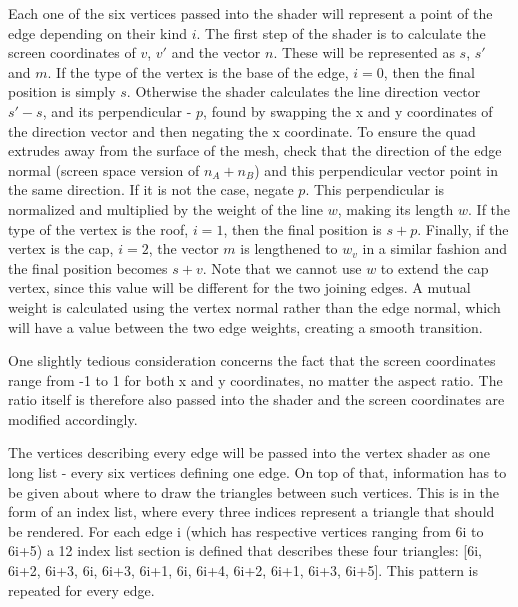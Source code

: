 \documentclass[a4paper, 12pt]{article}
\begin{document}
Each one of the six vertices passed into the shader will represent a point of the edge depending on their kind $i$. The first step of the shader is to calculate the screen coordinates of  $v$, $v'$ and the vector $n$. These will be represented as $s$, $s'$ and $m$. If the type of the vertex is the base of the edge, $i=0$, then the final position is simply $s$. Otherwise the shader calculates the line direction vector $s'-s$, and its perpendicular - $p$, found by swapping the x and y coordinates of the direction vector and then negating the x coordinate. To ensure the quad extrudes away from the surface of the mesh, check that the direction of the edge normal (screen space version of $n_A+n_B$) and this perpendicular vector point in the same direction. If it is not the case, negate $p$. This perpendicular is normalized and multiplied by the weight of the line $w$, making its length $w$. If the type of the vertex is the roof, $i=1$, then the final position is $s+p$. Finally, if the vertex is the cap, $i=2$, the vector $m$ is lengthened to $w_v$ in a similar fashion and the final position becomes $s+v$. Note that we cannot use $w$ to extend the cap vertex, since this value will be different for the two joining edges. A mutual weight is calculated using the vertex normal rather than the edge normal, which will have a value between the two edge weights, creating a smooth transition.

One slightly tedious consideration concerns the fact that the screen coordinates range from -1 to 1 for both x and y coordinates, no matter the aspect ratio. The ratio itself is therefore also passed into the shader and the screen coordinates are modified accordingly.

The vertices describing every edge will be passed into the vertex shader as one long list - every six vertices defining one edge. On top of that, information has to be given about where to draw the triangles between such vertices. This is in the form of an index list, where every three indices represent a triangle that should be rendered. For each edge i (which has respective vertices ranging from 6i to 6i+5) a 12 index list section is defined that describes these four triangles: [6i, 6i+2, 6i+3, 6i, 6i+3, 6i+1, 6i, 6i+4, 6i+2, 6i+1, 6i+3, 6i+5]. This pattern is repeated for every edge.
\end{document}
